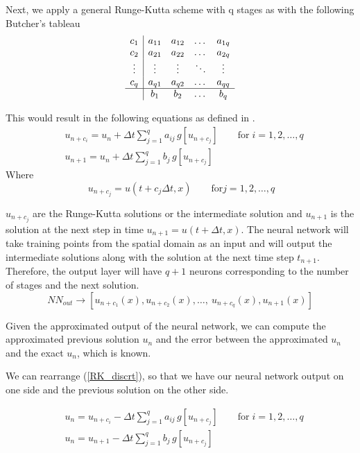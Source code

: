 \documentclass[a4paper, onecolumn, 12pt]{article}
\begin{document}
Next, we apply a general Runge-Kutta scheme with q stages as with the following Butcher's tableau 
$$
\begin{array}{c|cccc}
c_1 & a_{11} & a_{12} & \dots & a_{1q} \\ 
c_2 & a_{21} & a_{22} & \dots & a_{2q} \\ 
\vdots & \vdots & \vdots & \ddots & \vdots \\ 
c_q & a_{q1} & a_{q2} & \dots & a_{qq} \\ 
\hline
& b_1 & b_2 & \dots & b_q
\end{array}
$$

This would result in the following equations as defined in \cite{iserles2009first}.
\begin{equation}\label{RK_discrt}
\begin{aligned}
& u_{n+c_i} = u_n + \Delta t \sum_{j=1}^{q} a_{ij} \, g[u_{n+c_j}] \qquad \text{for} \; i = 1, 2, \dots, q \\
& u_{n+1} = u_n + \Delta t \sum_{j=1}^{q} b_j \, g[u_{n+c_j}] 
\end{aligned}
\end{equation}
Where 
$$\: u_{n+c_j} = u(t+c_j \Delta t, x) \qquad \text{for} j = 1, 2, \dots, q$$ 

$u_{n + c_j}$ are the Runge-Kutta solutions or the intermediate solution and 
$u_{n+1}$ is the solution at the next step in time $u_{n+1} = u(t + \Delta t, x)$.
The neural network will take training points from the spatial domain as an input 
and will output the intermediate solutions along with the solution at the next time step $t_{n+1}$.
Therefore, the output layer will have $q+1$ neurons corresponding to the number of stages and the next 
solution. 
\begin{equation}\label{NN_RK_output}
NN_{out} \rightarrow [u_{n+c_1}(x), u_{n+c_2}(x), \dots, \ u_{n+c_q}(x), u_{n+1}(x)]
\end{equation}

Given the approximated output of the neural network, we can compute the ap\-prox\-i\-mat\-ed previous solution 
$u_{n}$ and the error between the approximated $u_n$ and the exact $u_n$, which is known.

We can rearrange (\ref{RK_discrt}), so that we have our neural network output on one side and the 
previous solution on the other side.

\begin{equation}\label{RK_discrt_rearranged}
\begin{aligned}
& u_n = u_{n+c_i} -  \Delta t \sum_{j=1}^{q} a_{ij} \, g[u_{n+c_j}] 
\qquad \text{for} \; i = 1, 2, \dots, q \\
& u_n = u_{n+1} - \Delta t \sum_{j=1}^{q} b_j \, g[u_{n+c_j}] 
\end{aligned}
\end{equation}
\end{document}
